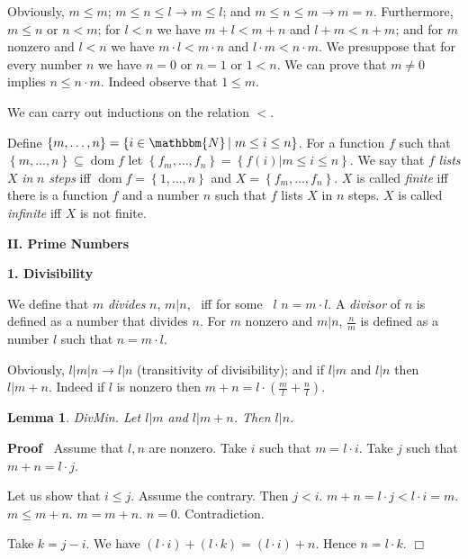\documentclass{letter}
\newcommand{\section}[1]{\medskip\bigskip

\noindent\textbf{\LARGE #1}}
\newcommand{\subsection}[1]{\medskip\bigskip

\noindent\textbf{\Large #1}}
\newcommand{\tmem}[1]{{\em #1\/}}
\newcommand{\tmop}[1]{\ensuremath{\operatorname{#1}}}
\newenvironment{proof}{\noindent\textbf{Proof\ }}{\hspace*{\fill}$\Box$\medskip}
\newtheorem{lemma}{Lemma}
\begin{document}
Obviously, $m \leqslant m$; $m \leqslant n \leqslant l \rightarrow m \leq l$;
and $m \leq n \leq m \rightarrow m = n$. Furthermore, $m \leq n$ or $n < m$;
for $l < n$ we have $m + l < m + n$ and $l + m < n + m$; and for $m$ nonzero
and $l < n$ we have $m \cdot l < m \cdot n$ and $l \cdot m < n \cdot m$. We
presuppose that for every number $n$ we have $n = 0$ or $n = 1$ or $1 < n$. We
can prove that $m \neq 0$ implies $n \leqslant n \cdot m$. Indeed observe that
$1 \leqslant m$.

We can carry out inductions on the relation $<$.

Define $\left\{ m, \ldots, n \right\} = \left\{ i \in \mathbbm{N} \left|
\right. m \leq i \leq n \right\}$. For a function $f$ such that $\left\{ m,
\ldots, n \right\} \subseteq \tmop{dom} f$ let $\left\{ f_m, \ldots, f_n
\right\} = \left\{ f \left( i \right)  \left| m \leq i \leq n \right.
\right\}$. We say that $f$ {\tmem{lists}} $X$ {\tmem{in}} $n$ {\tmem{steps}}
iff $\tmop{dom} f = \left\{ 1, \ldots, n \right\}$ and $X = \left\{ f_m,
\ldots, f_n \right\}$. $X$ is called {\tmem{finite}} iff there is a function
$f$ and a number $n$ such that $f$ lists $X$ in $n$ steps. $X$ is called
{\tmem{infinite}} iff $X$ is not finite.



\section{II. Prime Numbers}

\subsection{1. Divisibility}

We define that $m$ {\tmem{divides}} $n$, $m \left| n \right. $, \ iff for some
\ $l$ $n = m \cdot l$. A {\tmem{divisor}} of $n$ is defined as a number that
divides $n$. For $m$ nonzero and $m \left| \right. n$, $\frac{n}{m}$ is
defined as a number $l$ such that $n = m \cdot l$. \

Obviously, $l |m| n \rightarrow l|n$ (transitivity of divisibility); and if
$l|m$ and $l|n$ then $l|m + n$. Indeed if $l$ is nonzero then $m + n = l \cdot
( \frac{m}{l} + \frac{n}{l})$.

\begin{lemma}
  DivMin. Let $l|m$ and $l|m + n$. Then $l|n$.
\end{lemma}

\begin{proof}
  Assume that $l, n$ are nonzero. Take $i$ such that $m = l \cdot i$. Take $j$
  such that $m + n = l \cdot j$.
  
  Let us show that $i \leq j$. Assume the contrary. Then $j < i$. $m + n = l
  \cdot j < l \cdot i = m$. $m \leq m + n$. $m = m + n$. $n = 0$.
  Contradiction.
  
  Take $k = j - i$. We have $(l \cdot i) + (l \cdot k) = (l \cdot i) + n$.
  Hence $n = l \cdot k$.
\end{proof}
\end{document}
